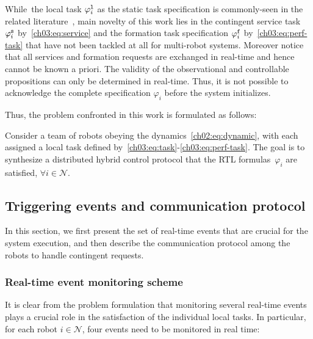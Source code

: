 \begin{remark}\label{ch03:remark:req}
While~the local task $\varphi_i^{\textup{\texttt{l}}}$ as the static task specification is commonly-seen in the related literature~\cite{bhatia2010sampling, guo2015multi}, main novelty of this work lies in the contingent service task $\varphi_{i}^{\textup{\texttt{s}}}$ by~\eqref{ch03:eq:service} and the formation task specification $\varphi_i^{\textup{\texttt{f}}}$ by~\eqref{ch03:eq:perf-task} that have not been tackled at all for multi-robot systems. Moreover notice that all services and formation requests are exchanged in real-time and hence cannot be known a priori. The validity of the observational and controllable propositions can only be determined in real-time. Thus, it is not possible to acknowledge the complete specification $\varphi_i$ before the system initializes.
\end{remark}

Thus, the problem confronted in this work is formulated as follows:
\begin{problem} \label{ch03:prob:prob-form}
Consider a team of robots obeying the dynamics~\eqref{ch02:eq:dynamic}, with
each assigned a local task  defined by~\eqref{ch03:eq:task}-\eqref{ch03:eq:perf-task}.
The goal is to synthesize a distributed hybrid control protocol that the RTL formulas~$\varphi_i$ are satisfied, $\forall i\in \mathcal{N}$.
\end{problem}





\subsection{Triggering events and communication protocol}\label{ch03:sec:communication}

In this section, we first present the set of real-time events that are crucial for the system execution, and then describe the communication protocol among the robots to handle contingent requests.


\subsubsection{Real-time event monitoring scheme}\label{ch03:sec:discrete-event}
It is clear from the problem formulation that monitoring several real-time events plays a crucial role in the satisfaction of the individual local tasks.
In particular, for each robot $i\in \mathcal{N}$, four events  need to be monitored in real time:

